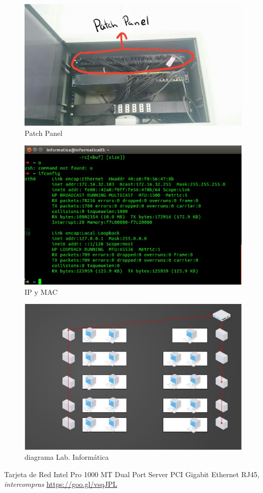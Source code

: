 \documentclass[onecolumn,11pts]{IEEEtran}
\begin{document}
\begin{figure}[h!]
\centering
\includegraphics[scale=0.5]{patchpanel}
\caption{Patch Panel}
\label{fig:patch panel}
\end{figure}

\begin{figure}[h!]
\centering
\includegraphics[scale=0.5]{terminal}
\caption{IP y MAC}
\label{fig:terminal}
\end{figure}  

\begin{figure}[h!]
\centering
 \includegraphics[scale=0.6]{diagrama}
\caption{diagrama Lab. Informática}
\label{fig:diagrama}
\end{figure}


\clearpage

\begin{thebibliography}{15}

  Tarjeta de Red Intel Pro 1000 MT Dual Port Server PCI Gigabit Ethernet RJ45,
  \emph{intercompras}
  \url{https://goo.gl/vsqJPL}
  

\end{thebibliography}
\end{document}
